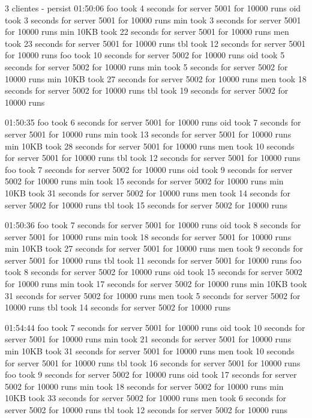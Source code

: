 \documentclass[11pt]{article}
\begin{document}
 3 clientes - persist
01:50:06
foo took 4 seconds for server 5001 for 10000 runs
oid took 3 seconds for server 5001 for 10000 runs
min took 3 seconds for server 5001 for 10000 runs
min 10KB took 22 seconds for server 5001 for 10000 runs
men took 23 seconds for server 5001 for 10000 runs
tbl took 12 seconds for server 5001 for 10000 runs
foo took 10 seconds for server 5002 for 10000 runs
oid took 5 seconds for server 5002 for 10000 runs
min took 5 seconds for server 5002 for 10000 runs
min 10KB took 27 seconds for server 5002 for 10000 runs
men took 18 seconds for server 5002 for 10000 runs
tbl took 19 seconds for server 5002 for 10000 runs

01:50:35
foo took 6 seconds for server 5001 for 10000 runs
oid took 7 seconds for server 5001 for 10000 runs
min took 13 seconds for server 5001 for 10000 runs
min 10KB took 28 seconds for server 5001 for 10000 runs
men took 10 seconds for server 5001 for 10000 runs
tbl took 12 seconds for server 5001 for 10000 runs
foo took 7 seconds for server 5002 for 10000 runs
oid took 9 seconds for server 5002 for 10000 runs
min took 15 seconds for server 5002 for 10000 runs
min 10KB took 31 seconds for server 5002 for 10000 runs
men took 14 seconds for server 5002 for 10000 runs
tbl took 15 seconds for server 5002 for 10000 runs

01:50:36
foo took 7 seconds for server 5001 for 10000 runs
oid took 8 seconds for server 5001 for 10000 runs
min took 18 seconds for server 5001 for 10000 runs
min 10KB took 27 seconds for server 5001 for 10000 runs
men took 9 seconds for server 5001 for 10000 runs
tbl took 11 seconds for server 5001 for 10000 runs
foo took 8 seconds for server 5002 for 10000 runs
oid took 15 seconds for server 5002 for 10000 runs
min took 17 seconds for server 5002 for 10000 runs
min 10KB took 31 seconds for server 5002 for 10000 runs
men took 5 seconds for server 5002 for 10000 runs
tbl took 14 seconds for server 5002 for 10000 runs

01:54:44
foo took 7 seconds for server 5001 for 10000 runs
oid took 10 seconds for server 5001 for 10000 runs
min took 21 seconds for server 5001 for 10000 runs
min 10KB took 31 seconds for server 5001 for 10000 runs
men took 10 seconds for server 5001 for 10000 runs
tbl took 16 seconds for server 5001 for 10000 runs
foo took 9 seconds for server 5002 for 10000 runs
oid took 17 seconds for server 5002 for 10000 runs
min took 18 seconds for server 5002 for 10000 runs
min 10KB took 33 seconds for server 5002 for 10000 runs
men took 6 seconds for server 5002 for 10000 runs
tbl took 12 seconds for server 5002 for 10000 runs
\end{document}

